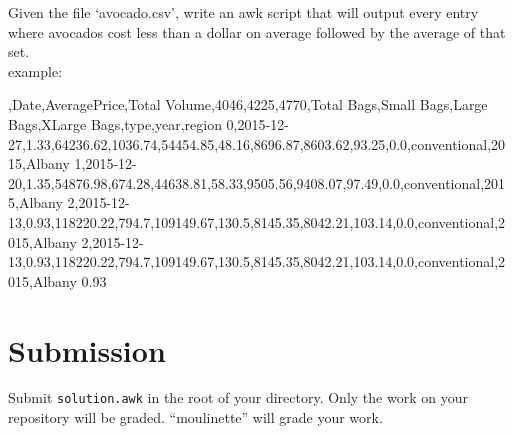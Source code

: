 \documentclass{42-en}
\begin{document}
    Given the file `avocado.csv', write an awk script that will output
    every entry where avocados cost less than a dollar on average followed
    by the average of that set.\\

    example:
    \begin{42console}
,Date,AveragePrice,Total Volume,4046,4225,4770,Total Bags,Small Bags,Large Bags,XLarge Bags,type,year,region
0,2015-12-27,1.33,64236.62,1036.74,54454.85,48.16,8696.87,8603.62,93.25,0.0,conventional,2015,Albany
1,2015-12-20,1.35,54876.98,674.28,44638.81,58.33,9505.56,9408.07,97.49,0.0,conventional,2015,Albany
2,2015-12-13,0.93,118220.22,794.7,109149.67,130.5,8145.35,8042.21,103.14,0.0,conventional,2015,Albany
2,2015-12-13,0.93,118220.22,794.7,109149.67,130.5,8145.35,8042.21,103.14,0.0,conventional,2015,Albany
0.93
%
    \end{42console}

\chapter{Submission}

    Submit \texttt{solution.awk} in the root of your directory.
    Only the work on your repository will be graded.
    ``moulinette'' will grade your work.\\
\end{document}
